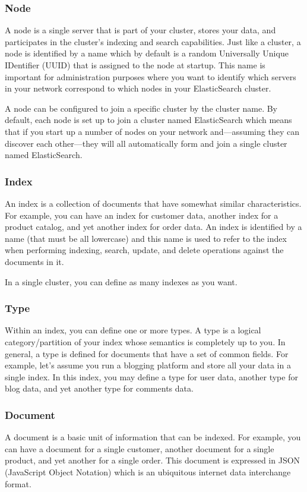 \documentclass[a4paper, 12pt]{book}
\begin{document}
\subsubsection{Node}
A node is a single server that is part of your cluster, stores your data, and participates in the cluster's indexing and search capabilities. Just like a cluster, a node is identified by a name which by default is a random Universally Unique IDentifier (UUID) that is assigned to the node at startup. This name is important for administration purposes where you want to identify which servers in your network correspond to which nodes in your ElasticSearch cluster.

A node can be configured to join a specific cluster by the cluster name. By default, each node is set up to join a cluster named ElasticSearch which means that if you start up a number of nodes on your network and—assuming they can discover each other—they will all automatically form and join a single cluster named ElasticSearch.

\subsubsection{Index}
An index is a collection of documents that have somewhat similar characteristics. For example, you can have an index for customer data, another index for a product catalog, and yet another index for order data. An index is identified by a name (that must be all lowercase) and this name is used to refer to the index when performing indexing, search, update, and delete operations against the documents in it.

In a single cluster, you can define as many indexes as you want.

\subsubsection{Type}
Within an index, you can define one or more types. A type is a logical category/partition of your index whose semantics is completely up to you. In general, a type is defined for documents that have a set of common fields. For example, let's assume you run a blogging platform and store all your data in a single index. In this index, you may define a type for user data, another type for blog data, and yet another type for comments data.

\subsubsection{Document}
A document is a basic unit of information that can be indexed. For example, you can have a document for a single customer, another document for a single product, and yet another for a single order. This document is expressed in JSON (JavaScript Object Notation) which is an ubiquitous internet data interchange format.
\end{document}
